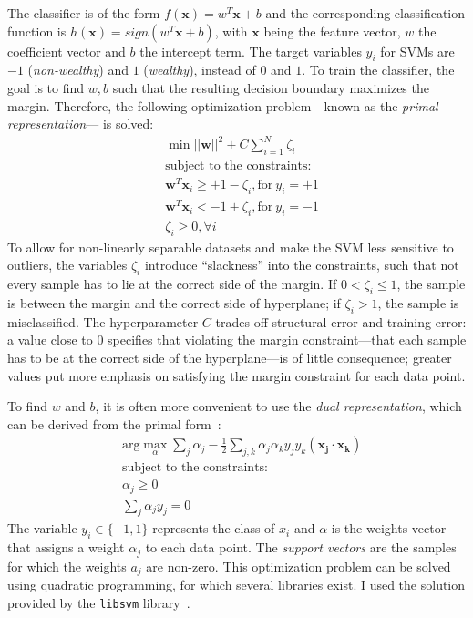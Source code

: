 \documentclass[a4paper,11pt]{article}
\begin{document}
The classifier is of the form $f(\mathbf{x}) = w^T\mathbf{x} + b$ and
the corresponding classification function is
$h(\mathbf{x}) = sign(w^T\mathbf{x} + b)$, with $\mathbf{x}$ being the
feature vector, $w$ the coefficient vector and $b$ the intercept
term. The target variables $y_i$ for SVMs are $-1$ (\emph{non-wealthy})
and $1$ (\emph{wealthy}), instead of $0$ and $1$. To train the
classifier, the goal is to find $w, b$ such that the resulting
decision boundary maximizes the margin.
Therefore, the following optimization problem---known as the
\emph{primal representation}--- is solved:
\begin{align}
  & \min ||\mathbf{w}||^2 + C \sum_{i = 1}^N\zeta_i\\
  & \text{subject to the constraints:} \nonumber\\
 & \mathbf{w}^T\mathbf{x}_i \geq + 1-\zeta_i, \text{for}~y_i =
  +1 \nonumber\\
 & \mathbf{w}^T\mathbf{x}_i <-1+\zeta_i, \text{for}~y_i =
  -1 \nonumber\\
& \zeta_i \geq 0, \forall i \nonumber
\end{align}
To allow for non-linearly separable datasets and make the SVM less
sensitive to outliers, the variables $\zeta_i$ introduce ``slackness''
into the constraints, such that not every sample has to lie at the
correct side of the margin. If $0 < \zeta_i \leq 1$, the sample is
between the margin and the correct side of hyperplane; if
$\zeta_i > 1$, the sample is misclassified. The hyperparameter $C$
trades off structural error and training error: a value close to 0
specifies that violating the margin constraint---that each sample has
to be at the correct side of the hyperplane---is of little
consequence; greater values put more emphasis on satisfying the margin
constraint for each data point.


To find $w$ and $b$, it is often more convenient to use the \emph{dual
  representation}, which can be derived from the primal
form~\cite{russell2003artificial}:
\begin{align}
\label{eq:dual}
&\text{arg}\max_\alpha\sum_j\alpha_j -
  \frac{1}{2}\sum_{j,k}\alpha_j\alpha_ky_jy_k(\mathbf{x_j} \cdot
  \mathbf{x_k}) \\
  & \text{subject to the constraints:} \nonumber\\
& \alpha_j \geq 0 \nonumber\\
& \sum_j\alpha_jy_j=0 \nonumber
\end{align}
The variable $y_i \in \{-1, 1\}$ represents the
class of $x_i$ and $\alpha$ is the weights vector that assigns a weight
$\alpha_j$ to each data point. The \emph{support vectors} are the
samples for which the weights $a_j$ are non-zero. 
This optimization problem can be solved using
quadratic programming, for which several libraries
exist. I used the solution provided by the \texttt{libsvm}
library~\cite{libsvm2011}.
\end{document}
